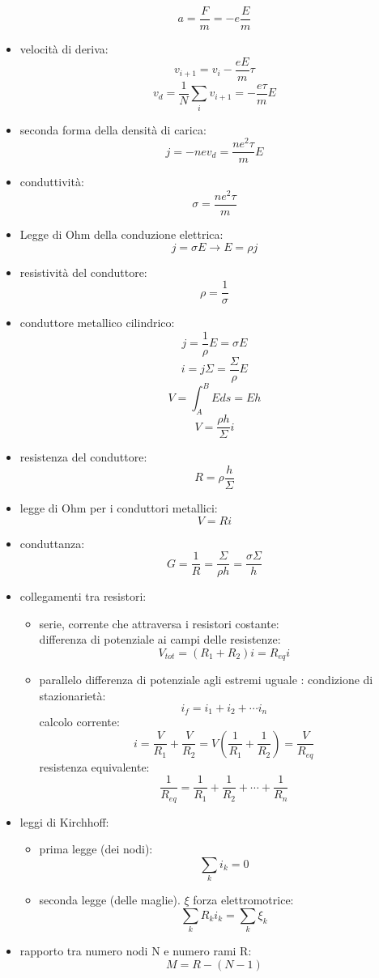 \documentclass[a4paper,12pt, oneside]{book}
\begin{document}
\begin{itemize}
$$a=\frac{F}{m}=-e\frac{E}{m}$$
\item velocità di deriva:
$$v_{i+1}=v_i-\frac{eE}{m}\tau$$
$$v_d=\frac{1}{N}\sum_i v_{i+1}=-\frac{e\tau}{m}E$$
\item seconda forma della densità di carica:
$$j=-nev_d=\frac{ne^2\tau}{m}E$$
\item conduttività:
$$\sigma=\frac{ne^2\tau}{m}$$
\item Legge di Ohm della conduzione elettrica:
$$j=\sigma E\to E=\rho j$$
\item resistività del conduttore:
$$\rho =\frac{1}{\sigma}$$
\item conduttore metallico cilindrico:
$$j=\frac{1}{\rho}E=\sigma E$$
$$i=j\Sigma=\frac{\Sigma}{\rho}E$$
$$V=\int_A^BEds=Eh$$
$$V=\frac{\rho h}{\Sigma}i$$
\item resistenza  del conduttore:
$$R=\rho\frac{h}{\Sigma}$$
\item legge di Ohm per i conduttori metallici:
$$V=Ri$$
\item conduttanza:
$$G=\frac{1}{R}=\frac{\Sigma}{\rho h}=\frac{\sigma\Sigma}{h}$$
\item collegamenti tra resistori:
\begin{itemize}
\item serie, corrente che attraversa i resistori costante:\\
differenza di potenziale ai campi delle resistenze:
$$V_{tot}=(R_1+R_2)i=R_{eq}i$$

\item parallelo differenza di potenziale agli estremi uguale :
condizione di stazionarietà:
$$i_f=i_1+i_2+\cdots i_n$$
calcolo corrente:
$$i=\frac{V}{R_1}+\frac{V}{R_2}=V\left(\frac{1}{R_1}+\frac{1}{R_2}\right)=\frac{V}{R_{eq}}$$
resistenza equivalente:
$$\frac{1}{R_{eq}}=\frac{1}{R_1}+\frac{1}{R_2}+\cdots+\frac{1}{R_n}$$
\end{itemize}
\item leggi di Kirchhoff:
\begin{itemize}
\item prima legge (dei nodi):
$$\sum_ki_k=0$$
\item seconda legge (delle maglie). $\xi$ forza elettromotrice:
$$\sum_kR_ki_k=\sum_k\xi_k$$
\end{itemize}
\item rapporto tra numero nodi N e numero rami R:
$$M=R-(N-1)$$
\end{itemize}
\end{document}
